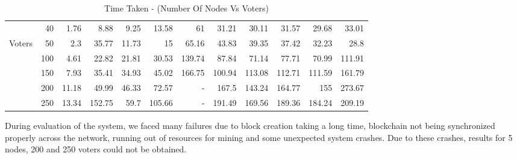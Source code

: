 \documentclass[oneside, 12pt]{book}
\begin{document}
\begin{table}[H]
{\begin{tabular}{|cr|rrrrrrrrrr|}
			\multicolumn{1}{|c|}{}                  & 40                                    & \multicolumn{1}{r|}{1.76}  & \multicolumn{1}{r|}{8.88}   & \multicolumn{1}{r|}{9.25}  & \multicolumn{1}{r|}{13.58}  & \multicolumn{1}{r|}{61}     & \multicolumn{1}{r|}{31.21}  & \multicolumn{1}{r|}{30.11}  & \multicolumn{1}{r|}{31.57}  & \multicolumn{1}{r|}{29.68}  & 33.01  \\ \cline{2-12}
			\multicolumn{1}{|c|}{Voters}            & 50                                    & \multicolumn{1}{r|}{2.3}   & \multicolumn{1}{r|}{35.77}  & \multicolumn{1}{r|}{11.73} & \multicolumn{1}{r|}{15}     & \multicolumn{1}{r|}{65.16}  & \multicolumn{1}{r|}{43.83}  & \multicolumn{1}{r|}{39.35}  & \multicolumn{1}{r|}{37.42}  & \multicolumn{1}{r|}{32.23}  & 28.8   \\ \cline{2-12}
			\multicolumn{1}{|c|}{\multirow{4}{*}{}} & 100                                   & \multicolumn{1}{r|}{4.61}  & \multicolumn{1}{r|}{22.82}  & \multicolumn{1}{r|}{21.81} & \multicolumn{1}{r|}{30.53}  & \multicolumn{1}{r|}{139.74} & \multicolumn{1}{r|}{87.84}  & \multicolumn{1}{r|}{71.14}  & \multicolumn{1}{r|}{77.71}  & \multicolumn{1}{r|}{70.99}  & 111.91 \\ \cline{2-12}
			\multicolumn{1}{|c|}{}                  & 150                                   & \multicolumn{1}{r|}{7.93}  & \multicolumn{1}{r|}{35.41}  & \multicolumn{1}{r|}{34.93} & \multicolumn{1}{r|}{45.02}  & \multicolumn{1}{r|}{166.75} & \multicolumn{1}{r|}{100.94} & \multicolumn{1}{r|}{113.08} & \multicolumn{1}{r|}{112.71} & \multicolumn{1}{r|}{111.59} & 161.79 \\ \cline{2-12}
			\multicolumn{1}{|c|}{}                  & 200                                   & \multicolumn{1}{r|}{11.18} & \multicolumn{1}{r|}{49.99}  & \multicolumn{1}{r|}{46.33} & \multicolumn{1}{r|}{72.57}  & \multicolumn{1}{r|}{-}      & \multicolumn{1}{r|}{167.5}  & \multicolumn{1}{r|}{143.24} & \multicolumn{1}{r|}{164.77} & \multicolumn{1}{r|}{155}    & 273.67 \\ \cline{2-12}
			\multicolumn{1}{|c|}{}                  & 250                                   & \multicolumn{1}{r|}{13.34} & \multicolumn{1}{r|}{152.75} & \multicolumn{1}{r|}{59.7}  & \multicolumn{1}{r|}{105.66} & \multicolumn{1}{r|}{-}      & \multicolumn{1}{r|}{191.49} & \multicolumn{1}{r|}{169.56} & \multicolumn{1}{r|}{189.36} & \multicolumn{1}{r|}{184.24} & 209.19 \\ \hline
		\end{tabular}%
	}
	\caption{Time Taken - (Number Of Nodes Vs Voters)}
	\label{tab:result-table}
\end{table}
During evaluation of the system, we faced many failures due to block creation taking a long time, blockchain not being synchronized properly across the network, running out of resources for mining and some unexpected system crashes. Due to these crashes, results for 5 nodes, 200 and 250 voters could not be obtained.
\newpage
\end{document}
